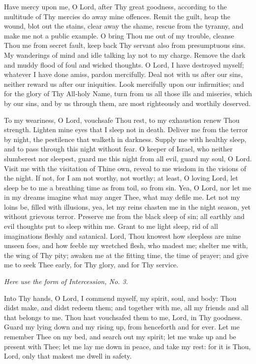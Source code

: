 Have mercy upon me, O Lord, after Thy great goodness, according to the multitude of Thy mercies do away mine offences. Remit the guilt, heap the wound, blot out the stains, clear away the shame, rescue from the tyranny, and make me not a public example. O bring Thou me out of my trouble, cleanse Thou me from secret fault, keep back Thy servant also from presumptuous sins. My wanderings of mind and idle talking lay not to my charge. Remove the dark and muddy flood of foul and wicked thoughts. O Lord, I have destroyed myself; whatever I have done amiss, pardon mercifully. Deal not with us after our sins, neither reward us after our iniquities. Look mercifully upon our infirmities; and for the glory of Thy All‑holy Name, turn from us all those ills and miseries, which by our sins, and by us through them, are most righteously and worthily deserved.


To my weariness, O Lord, vouchsafe Thou rest, to my exhaustion renew Thou strength. Lighten mine eyes that I sleep not in death. Deliver me from the terror by night, the pestilence that walketh in darkness. Supply me with healthy sleep, and to pass through this night without fear. O keeper of Israel, who neither slumberest nor sleepest, guard me this night from all evil, guard my soul, O Lord. Visit me with the visitation of Thine own, reveal to me wisdom in the visions of the night. If not, for I am not worthy, not worthy; at least, O loving Lord, let sleep be to me a breathing time as from toil, so from sin. Yea, O Lord, nor let me in my dreams imagine what may anger Thee, what may defile me. Let not my loins be, filled with illusions, yea, let my reins chasten me in the night season, yet without grievous terror. Preserve me from the black sleep of sin; all earthly and evil thoughts put to sleep within me. Grant to me light sleep, rid of all imaginations fleshly and satanical. Lord, Thou knowest how sleepless are mine unseen foes, and how feeble my wretched flesh, who madest me; shelter me with, the wing of Thy pity; awaken me at the fitting time, the time of prayer; and give me to seek Thee early, for Thy glory, and for Thy service.

\emph{Here use the form of Intercession, No. 3.}

Into Thy hands, O Lord, I commend myself, my spirit, soul, and body: Thou didst make, and didst redeem them; and together with me, all my friends and all that belongs to me. Thou hast vouchsafed them to me, Lord, in Thy goodness. Guard my lying down and my rising up, from henceforth and for ever. Let me remember Thee on my bed, and search out my spirit; let me wake up and be present with Thee; let me lay me down in peace, and take my rest: for it is Thou, Lord, only that makest me dwell in safety.

